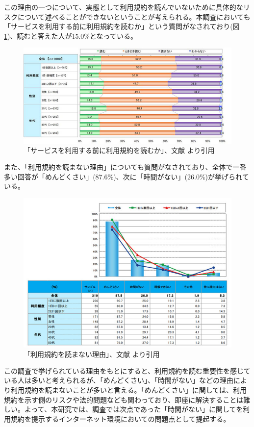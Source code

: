 この理由の一つについて、実態として利用規約を読んでいないために具体的なリスクについて述べることができないということが考えられる。本調査においても「サービスを利用する前に利用規約を読むか」という質問がなされており(図\ref{img:tosyomuka})、読むと答えた人が15.0\%となっている。
\begin{figure}[h]
  \begin{center}
      \includegraphics[width=13cm]{img/tosyomuka.jpg}
      \caption{「サービスを利用する前に利用規約を読むか」、文献\cite{利用規約をきちん32:online} より引用}
      \label{img:tosyomuka}
  \end{center}
\end{figure}
また、「利用規約を読まない理由」についても質問がなされており、全体で一番多い回答が「めんどくさい」(87.6\%)、次に「時間がない」(26.0\%)が挙げられている。
\begin{figure}[h]
  \begin{center}
      \includegraphics[width=13cm]{img/tosyomanairiyuu.jpg}
      \caption{「利用規約を読まない理由」、文献\cite{利用規約をきちん32:online} より引用}
      \label{img:tosyomanairiyuu}
  \end{center}
\end{figure}
この調査で挙げられている理由をもとにすると、利用規約を読む重要性を感じている人は多いと考えられるが、「めんどくさい」、「時間がない」などの理由により利用規約を読まないことが多いと言える。「めんどくさい」に関しては、利用規約を示す側のリスクや法的問題なども関わっており、即座に解決することは難しい。よって、本研究では、調査では次点であった「時間がない」に関してを利用規約を提示するインターネット環境においての問題点として提起する。

